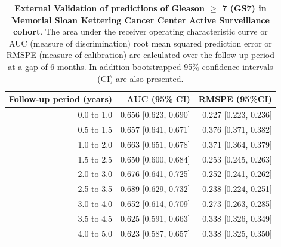 \begin{table}[!htb]
\small\sf\centering
\caption{\textbf{External Validation of predictions of Gleason $\geq$ 7 (GS7) in Memorial Sloan Kettering Cancer Center Active Surveillance cohort}. The area under the receiver operating characteristic curve or AUC (measure of discrimination) root mean squared prediction error or RMSPE (measure of calibration) are calculated over the follow-up period at a gap of 6 months. In addition bootstrapped 95\% confidence intervals (CI) are also presented.}
\label{tab:AUC_PE_MSKCC}
\begin{tabular}{r|r|r}
\hline
\hline
Follow-up period (years) & AUC (95\% CI) & RMSPE (95\%CI)\\ 
\hline
0.0 to 1.0 & 0.656 [0.623, 0.690] & 0.227 [0.223, 0.236]\\
0.5 to 1.5 & 0.657 [0.641, 0.671] & 0.376 [0.371, 0.382]\\
1.0 to 2.0 & 0.663 [0.651, 0.678] & 0.371 [0.364, 0.379]\\
1.5 to 2.5 & 0.650 [0.600, 0.684] & 0.253 [0.245, 0.263]\\
2.0 to 3.0 & 0.676 [0.641, 0.725] & 0.252 [0.241, 0.262]\\
2.5 to 3.5 & 0.689 [0.629, 0.732] & 0.238 [0.224, 0.251]\\
3.0 to 4.0 & 0.652 [0.614, 0.709] & 0.273 [0.263, 0.285]\\
3.5 to 4.5 & 0.625 [0.591, 0.663] & 0.338 [0.326, 0.349]\\
4.0 to 5.0 & 0.623 [0.587, 0.657] & 0.338 [0.325, 0.350]\\
\hline
\end{tabular}	
\end{table}

